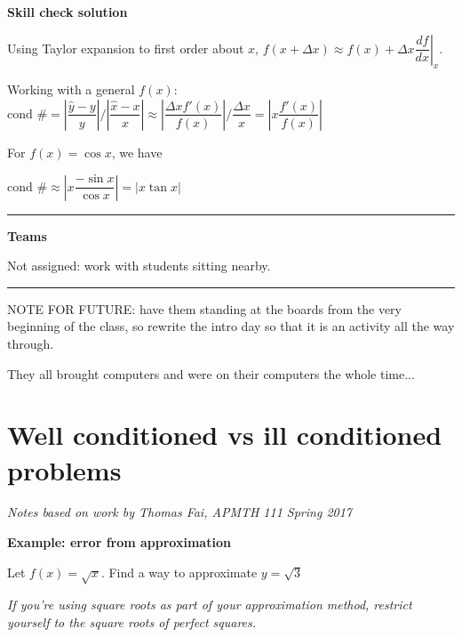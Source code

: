 \documentclass[12pt,letterpaper,noanswers]{exam}
\begin{document}
\noindent \textbf{Skill check solution}

Using Taylor expansion to first order about $x$, $f(x+\Delta x)\approx f(x) + \Delta x \left.\dfrac{df}{dx}\right\vert_x$.

Working with a general $f(x)$:
$\text{cond }\# = \left\vert\dfrac{\hat{y}-y}{y} \right\vert / \left\vert\dfrac{\hat{x}-x}{x} \right\vert \approx \left\vert \dfrac{\Delta xf'(x)}{f(x)} \right\vert / \dfrac{\Delta x}{x} = \left\vert x\dfrac{f'(x)}{f(x)}\right\vert$

For $f(x) = \cos x$, we have

$\text{cond }\# \approx \left\vert x \dfrac{-\sin x}{\cos x} \right\vert  = \vert x\tan x\vert$

\vspace{0.2cm}
\hrule
\vspace{0.2cm}

\noindent \textbf{Teams}

Not assigned: work with students sitting nearby.

\vspace{0.2cm}
\hrule
\vspace{0.2cm}

\noindent NOTE FOR FUTURE: have them standing at the boards from the very beginning of the class, so rewrite the intro day so that it is an activity all the way through.

\noindent They all brought computers and were on their computers the whole time...


\section{Well conditioned vs ill conditioned problems}

\noindent \emph{Notes based on work by Thomas Fai, APMTH 111 Spring 2017}

\noindent \textbf{Example: error from approximation}

\noindent Let $f(x) = \sqrt{x}$.
Find a way to approximate $y = \sqrt{3}$

\emph{If you're using square roots as part of your approximation method, restrict yourself to the square roots of perfect squares.}
\vspace{1in}


\end{document}
